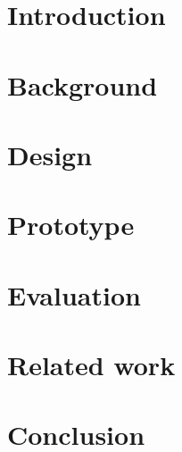 \section{Introduction}
\label{sec:intro}




\section{Background}
\label{sec:background}


\section{\tcpls Design}
\label{sec:background-design}




\section{\tcpls Prototype}
\label{sec:prototype}



\section{\tcpls Evaluation}
\label{sec:evaluation}



\section{Related work}
\label{sec:related}


\section{Conclusion}
\label{sec:conclusion}




%



